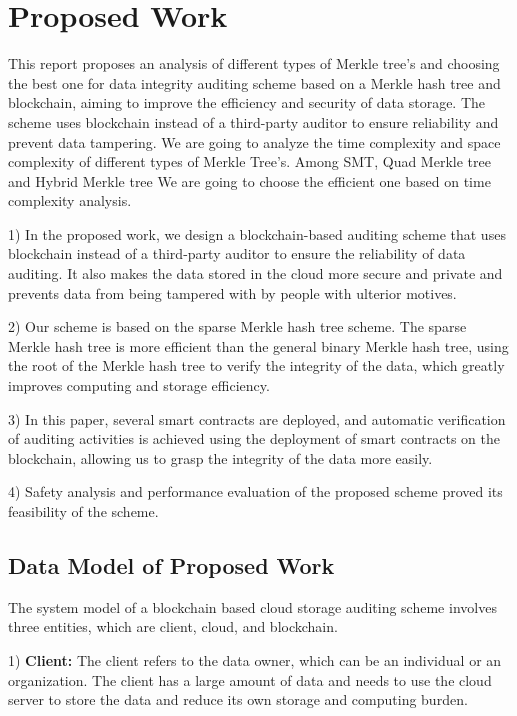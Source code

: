 \section{Proposed Work}
\large
This report proposes an analysis of different types of Merkle tree’s and choosing the best one for data integrity auditing scheme based on a Merkle hash tree and blockchain, aiming to improve the efficiency and security of data storage. The scheme uses blockchain instead of a third-party auditor to ensure reliability and prevent data tampering. We are going to analyze the time complexity and space complexity of different types of Merkle Tree’s. Among SMT, Quad Merkle tree and Hybrid Merkle tree We are going to choose the efficient one based on time complexity analysis.

1) In the proposed work, we design a blockchain-based auditing scheme that uses blockchain instead of a third-party auditor to ensure the reliability of data auditing. It also makes the data stored in the cloud more secure and private and prevents data from being tampered with by people with ulterior motives.

2) Our scheme is based on the sparse Merkle hash tree scheme. The sparse Merkle hash tree is more efficient than the general binary Merkle hash tree, using the root of the Merkle hash tree to verify the integrity of the data, which greatly improves computing and storage efficiency.

3) In this paper, several smart contracts are deployed, and automatic verification of auditing activities is achieved using the deployment of smart contracts on the blockchain, allowing us to grasp the integrity of the data more easily.

4) Safety analysis and performance evaluation of the proposed scheme proved its feasibility of the scheme.

\subsection{Data Model of Proposed Work}
The system model of a blockchain based cloud storage auditing scheme involves three entities, which are client, cloud, and blockchain.

1)\textbf{ Client:} The client refers to the data owner, which can be an individual or an organization. The client has a large amount of data and needs to use the cloud server to store the data and reduce its own storage and computing burden.

